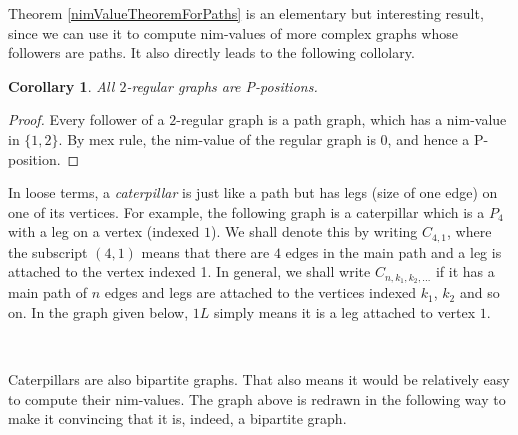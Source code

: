 \documentclass[a4paper, 12pt]{article}
\newtheorem{corollary}{Corollary}[theorem]
\theoremstyle{remark} %
\begin{document}
Theorem \ref{nimValueTheoremForPaths} is an elementary but interesting result, since we can use it to compute nim-values of more complex graphs whose followers are paths. It also directly leads to the following collolary.

\begin{corollary}
	All $2$-regular graphs are P-positions.
\end{corollary}

\begin{proof}
	Every follower of a $2$-regular graph is a path graph, which has a nim-value in $\{1,2\}$. By mex rule, the nim-value of the regular graph is $0$, and hence a P-position.
\end{proof}

In loose terms, a \textit{caterpillar}  is just like a path but has legs (size of one edge) on one of its vertices. For example, the following graph is a caterpillar which is a $P_4$ with a leg on a vertex (indexed $1$). We shall denote this by writing $C_{4,1}$, where the subscript $(4,1)$ means that there are $4$ edges in the main path and a leg is attached to the vertex indexed 1. In general, we shall write $C_{n,k_1,k_2,...}$ if it has a main path of $n$ edges and legs are attached to the vertices indexed $k_1$, $k_2$ and so on. In the graph given below, $1L$ simply means it is a leg attached to vertex $1$.\\

\begin{center}
\\
\end{center}

Caterpillars are also bipartite graphs. That also means it would be relatively easy to compute their nim-values. The graph above is redrawn in the following way to make it convincing that it is, indeed, a bipartite graph.\\
\end{document}
